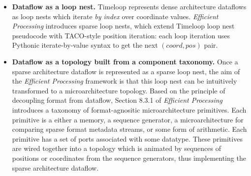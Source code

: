 \begin{itemize}
    \item \textbf{Dataflow as a loop nest.} Timeloop\cite{timeloop} represents dense architecture dataflows as loop nests which iterate \textit{by index} over coordinate values. \textit{Efficient Processing} introduces sparse loop nests, which extend Timeloop loop nest pseudocode with TACO\cite{taco_format}-style position iteration: each loop iteration uses Pythonic iterate-by-value syntax to get the next $(coord,pos)$ pair.
    \item \textbf{Dataflow as a topology built from a component taxonomy.} Once a sparse architecture dataflow is represented as a sparse loop nest, the aim of the \textit{Efficient Processing} framework is that this loop nest can be intuitively transformed to a microarchitecture topology. Based on the principle of decoupling format from dataflow, Section 8.3.1 of \textit{Efficient Processing} introduces a taxonomy of format-agnositic microarchitecture primitives. Each primitive is a either a memory, a sequence generator, a microarchitecture for comparing sparse format metadata streams, or some form of arithmetic. Each primitive has a set of ports associated with some datatype. These primitives are wired together into a topology which is animated by sequences of positions or coordinates from the sequence generators, thus implementing the sparse architecture dataflow.
\end{itemize}

